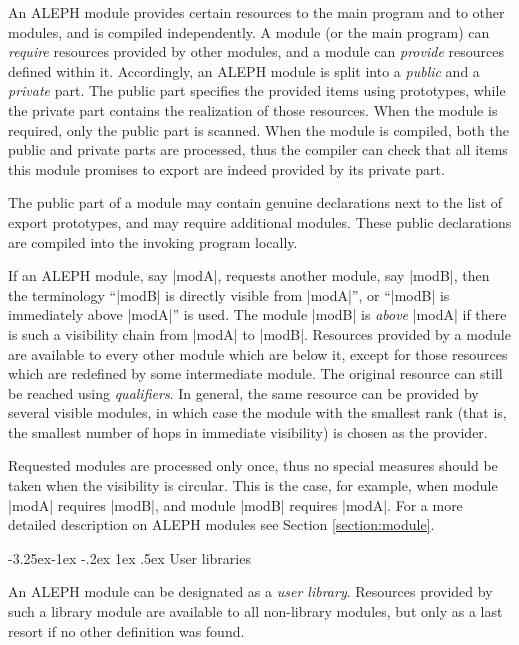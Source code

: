 \documentclass[titlepage]{article}
\makeatletter
\newcommand\A{\textsf{ALEPH}}
\renewcommand\subsection{%
\@startsection{subsection}{2}{\z@}%
   {-3.25ex\@plus -1ex \@minus -.2ex}%
   {1ex \@plus .5ex}%
   {\normalfont\normalsize\bfseries}}
\makeatother
\begin{document}
An \A{} module provides certain resources to the main program and to other
modules, and is compiled independently. A module (or the main program)
can \emph{require} resources provided by other modules, and a module can
\emph{provide} resources defined within it. Accordingly, an \A{} module is
split into a \emph{public} and a \emph{private} part. The public part
specifies the provided items using prototypes, while the private part
contains the realization of those resources. When the module is required,
only the public part is scanned. When the module is compiled, both the
public and private parts are processed, thus the compiler can check that all
items this module promises to export are indeed provided by its private
part.

The public part of a module may contain genuine declarations next to the
list of export prototypes, and may require additional modules. These public
declarations are compiled into the invoking program locally.

If an \A{} module, say \pp|modA|, requests another module, say \pp|modB|,
then the terminology ``\pp|modB| is directly visible from \pp|modA|'', or
``\pp|modB| is immediately above \pp|modA|'' is used. The module \pp|modB|
is \emph{above} \pp|modA| if there is such a visibility chain from \pp|modA|
to \pp|modB|. Resources provided by a module are available to every other
module which are below it, except for those resources which are redefined by
some intermediate module. The original resource can still be reached using
\emph{qualifiers}. In general, the same resource can be provided by several
visible modules, in which case the module with the smallest rank (that is,
the smallest number of hops in immediate visibility) is chosen as the
provider.

Requested modules are processed only once, thus no special measures should be
taken when the visibility is circular. This is the case, for example, when
module \pp|modA| requires \pp|modB|, and module \pp|modB| requires
\pp|modA|. For a more detailed description on \A{} modules see Section
\ref{section:module}.
 
\subsection{User libraries}\label{subsec:user-library}

An \A{} module can be designated as a \emph{user library}. Resources
provided by such a library module are available to all non-library modules,
but only as a last resort if no other definition was found.
\end{document}
